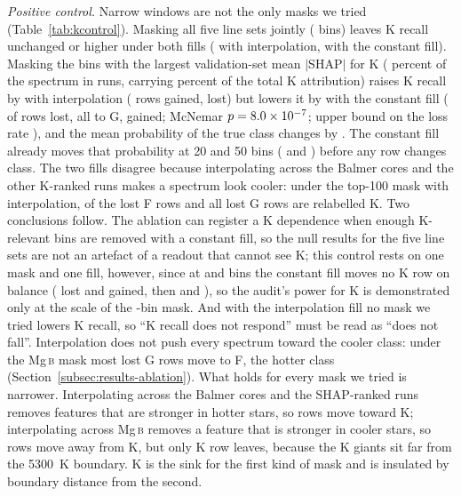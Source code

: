 \documentclass[11pt,a4paper]{article}
\newcommand{\Mgb}{Mg\,\textsc{b}\xspace}
\begin{document}
\emph{Positive control.} Narrow windows are not the only masks we tried (Table~\ref{tab:kcontrol}). Masking all five line sets jointly (\pcBinsJoint{} bins) leaves K recall unchanged or higher under both fills (\pcPrimJointKDelta{} with interpolation, \pcConstJointKDelta{} with the constant fill). Masking the \pcBinsTopHundred{} bins with the largest validation-set mean $|$SHAP$|$ for K (\pcBinsPctTopHundred{} percent of the spectrum in \pcWindowsTopHundred{} runs, carrying \pcShapShareTopHundred{} percent of the total K attribution) raises K recall by \pcPrimTopHundredKDelta{} with interpolation (\pcPrimTopHundredKGained{} rows gained, \pcPrimTopHundredKLost{} lost) but lowers it by \pcConstTopHundredKDelta{} with the constant fill (\pcConstTopHundredKLost{} of \nClassK{} rows lost, all to G, \pcConstTopHundredKGained{} gained; McNemar $p = 8.0\times10^{-7}$; upper bound on the loss rate \pcConstTopHundredKUpper), and the mean probability of the true class changes by \pcConstTopHundredKDp. The constant fill already moves that probability at 20 and 50 bins (\pcConstTopTwentyKDp{} and \pcConstTopFiftyKDp) before any row changes class. The two fills disagree because interpolating across the Balmer cores and the other K-ranked runs makes a spectrum look cooler: under the top-100 mask with interpolation, \pcPrimTopHundredFToK{} of the \pcPrimTopHundredFLost{} lost F rows and all \pcPrimTopHundredGLost{} lost G rows are relabelled K. Two conclusions follow. The ablation can register a K dependence when enough K-relevant bins are removed with a constant fill, so the null results for the five line sets are not an artefact of a readout that cannot see K; this control rests on one mask and one fill, however, since at \pcBinsTopTwenty{} and \pcBinsTopFifty{} bins the constant fill moves no K row on balance (\pcConstTopTwentyKLost{} lost and \pcConstTopTwentyKGained{} gained, then \pcConstTopFiftyKLost{} and \pcConstTopFiftyKGained), so the audit's power for K is demonstrated only at the scale of the \pcBinsTopHundred-bin mask. And with the interpolation fill no mask we tried lowers K recall, so ``K recall does not respond'' must be read as ``does not fall''. Interpolation does not push every spectrum toward the cooler class: under the \Mgb mask most lost G rows move to F, the hotter class (Section~\ref{subsec:results-ablation}). What holds for every mask we tried is narrower. Interpolating across the Balmer cores and the SHAP-ranked runs removes features that are stronger in hotter stars, so rows move toward K; interpolating across \Mgb removes a feature that is stronger in cooler stars, so rows move away from K, but only \ablPrimMgKLost{} K row leaves, because the K giants sit far from the 5300~K boundary. K is the sink for the first kind of mask and is insulated by boundary distance from the second.
\end{document}

